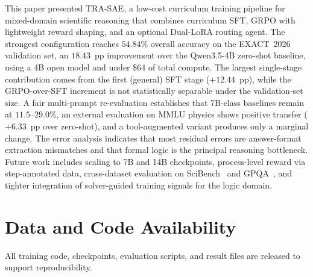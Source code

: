 \documentclass[preprint,12pt]{elsarticle}
\newcommand{\modelname}{\textsc{TRA-SAE}}
\newcommand{\basemodelname}{Qwen3.5-4B}
\newcommand{\dataset}{EXACT~2026}
\begin{document}
This paper presented \modelname{}, a low-cost curriculum training pipeline
for mixed-domain scientific reasoning that combines curriculum SFT, GRPO with
lightweight reward shaping, and an optional Dual-LoRA routing agent. The
strongest configuration reaches $54.84\%$ overall accuracy on the \dataset{}
validation set, an $18.43$~pp improvement over the \basemodelname{} zero-shot
baseline, using a 4B open model and under \$64 of total compute. The largest
single-stage contribution comes from the first (general) SFT stage
($+12.44$~pp), while the GRPO-over-SFT increment is not statistically
separable under the validation-set size. A fair multi-prompt re-evaluation establishes that
7B-class baselines remain at $11.5$--$29.0\%$, an external evaluation on MMLU
physics shows positive transfer ($+6.33$~pp over zero-shot), and a
tool-augmented variant produces only a marginal change. The error analysis
indicates that most residual errors are answer-format extraction mismatches
and that formal logic is the principal reasoning bottleneck. Future work
includes scaling to 7B and 14B checkpoints, process-level reward via
step-annotated data, cross-dataset evaluation on SciBench~\cite{Wang2024scibench}
and GPQA~\cite{Rein2023}, and tighter integration of solver-guided training
signals for the logic domain.

\section*{Data and Code Availability}
All training code, checkpoints, evaluation scripts, and result files are
released to support reproducibility.



\end{document}
